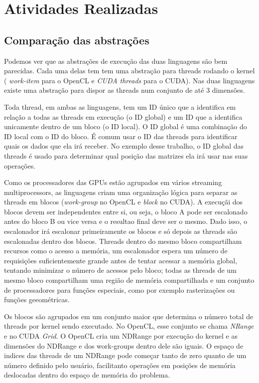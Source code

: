 \section{Atividades Realizadas}
\subsection{Comparação das abstrações}
Podemos ver que as abstrações de execução das duas linguagens são bem parecidas. Cada uma delas tem tem uma abstração
para threads rodando o kernel ( \textit{work-item} para o OpenCL e \textit{CUDA threads} para o CUDA). Nas duas linguagens
existe uma abstração para dispor as threads num conjunto de até 3 dimensões. 

Toda thread, em ambas as linguagens, tem um ID único que a identifica em relação a todas as threads em execução (o ID global) 
e um ID que a identifica unicamente dentro de um bloco (o ID local). O ID global é uma combinação do ID local com o ID do bloco. 
É comum usar o ID das threads para identificar quais os dados que ela irá receber. No exemplo desse trabalho, o ID 
global das threads é usado para determinar qual posição das matrizes ela irá usar nas suas operações. 

Como os processadores das GPUs estão agrupados em vários streaming multiprocessors, as linguagens criam uma organização lógica para
separar as threads em blocos (\textit{work-group} no OpenCL e \textit{block} no CUDA). A execuçãi dos blocos devem ser independentes entre
si, ou seja, o bloco A pode ser escalonado antes do bloco B ou vice versa e o resultao final deve ser o mesmo. Dado isso, o escalonador
irá escalonar primeiramente os blocos e só depois as threads são escalonadas dentro dos blocos. Threads dentro
do mesmo bloco compartilham recursos como o acesso a memória, um escalonador espera um número de requisições suficientemente grande 
antes de tentar acessar a memória global, tentando minimizar o número de acessos pelo bloco; todas as threads de um mesmo bloco
compartilham uma região de memória compartilhada e um conjunto de processadores para funções especiais, como por exemplo
rasterizações ou funções geeométricas. 

Os blocos são agrupados em um conjunto maior que determina o número total de threads por kernel sendo executado. 
No OpenCL, esse conjunto se chama \textit{NRange} e no CUDA \textit{Grid}. O OpenCL cria um NDRange por execução do kernel
e as dimensões do NDRange e dos work-groups dentro dele são iguais. O espaço de indices das threads de um NDRange pode começar 
tanto de zero quanto de um número definido pelo usuário, facilitanto operações em posições de memória deslocadas dentro 
do espaço de memória do problema.
	
